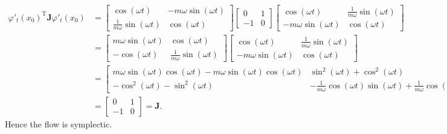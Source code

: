 \documentclass{report}
\theoremstyle{exampstyle} \newtheorem{example}[theorem]{Example}
\theoremstyle{exampstyle} \newtheorem{remark}[theorem]{Remark}
\theoremstyle{exampstyle} \newtheorem{definition}[theorem]{Definition}
\theoremstyle{exampstyle} \newtheorem{lemma}[theorem]{Lemma}
\begin{document}
\begin{align*}
	\varphi'_t(x_0)^\mathrm{T} \mathbf{J} \varphi'_t(x_0) &= \begin{bmatrix}
		\cos(\omega t) & -m\omega \sin(\omega t) \\
		\frac{1}{m\omega} \sin(\omega t) & \cos(\omega t)
	\end{bmatrix} \begin{bmatrix}
		0 & 1 \\
		-1 & 0
	\end{bmatrix} \begin{bmatrix}
		\cos(\omega t) & \frac{1}{m\omega} \sin(\omega t) \\
		-m\omega \sin(\omega t) & \cos(\omega t)
	\end{bmatrix} \\
	&= \begin{bmatrix}
		m \omega \sin(\omega t) & \cos(\omega t) \\
		-\cos(\omega t) & \frac{1}{m \omega} \sin(\omega t)
	\end{bmatrix} \begin{bmatrix}
		\cos(\omega t) & \frac{1}{m\omega} \sin(\omega t) \\
		-m\omega \sin(\omega t) & \cos(\omega t)
	\end{bmatrix} \\
	&= \begin{bmatrix}
		m \omega \sin(\omega t) \cos(\omega t) - m \omega \sin(\omega t) \cos(\omega t)  & \sin^2(\omega t) + \cos^2(\omega t) \\
		-\cos^2(\omega t) - \sin^2(\omega t) & -\frac{1}{m\omega}\cos(\omega t)\sin(\omega t) + \frac{1}{m \omega}\cos(\omega t)\sin(\omega t)
	\end{bmatrix} \\
	&= \begin{bmatrix}
		0 & 1 \\
		-1 & 0
	\end{bmatrix} = \mathbf{J}.
\end{align*}
Hence the flow is symplectic.
\end{document}
